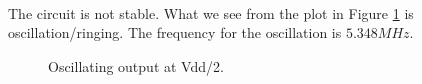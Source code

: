 \documentclass[a4paper,english,11pt]{article}
\begin{document}
\\
The circuit is not stable. What we see from the plot in Figure \ref{fig:oscil:out} is oscillation/ringing. The frequency for the oscillation is
$5.348 MHz$.
\begin{figure}[!htbp]
 \centering
  \caption{Oscillating output at Vdd/2.}
  \label{fig:oscil:out}	
\end{figure}

\end{document}
